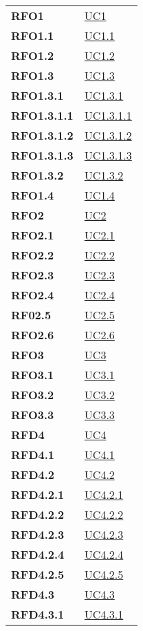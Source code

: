 \begin{longtable}[H]{>{\centering\bfseries}m{8cm} >{\centering\arraybackslash}m{8cm}}
    RFO1 & \hyperref[sub:uc1]{UC1} \\
    RFO1.1 & \hyperref[ssub:uc1.1]{UC1.1} \\
    RFO1.2 & \hyperref[ssub:uc1.2]{UC1.2} \\
    RFO1.3 & \hyperref[ssub:uc1.3]{UC1.3} \\
    RFO1.3.1 & \hyperref[par:uc1.3.1]{UC1.3.1} \\
    RFO1.3.1.1 & \hyperref[spar:uc1.3.1.1]{UC1.3.1.1} \\
    RFO1.3.1.2 & \hyperref[spar:uc1.3.1.2]{UC1.3.1.2} \\
    RFO1.3.1.3 & \hyperref[spar:uc1.3.1.3]{UC1.3.1.3} \\
    RFO1.3.2 & \hyperref[par:uc1.3.2]{UC1.3.2} \\
    RFO1.4 & \hyperref[ssub:uc1.4]{UC1.4} \\
    RFO2 & \hyperref[sub:uc2]{UC2} \\
    RFO2.1 & \hyperref[ssub:uc2.1]{UC2.1} \\
    RFO2.2 & \hyperref[ssub:uc2.2]{UC2.2} \\
    RFO2.3 & \hyperref[ssub:uc2.3]{UC2.3} \\
    RFO2.4 & \hyperref[ssub:uc2.4]{UC2.4} \\
    RF02.5 & \hyperref[ssub:uc2.5]{UC2.5} \\
    RFO2.6 & \hyperref[ssub:uc2.6]{UC2.6} \\
    RFO3 & \hyperref[sub:uc3]{UC3} \\
    RFO3.1 & \hyperref[ssub:uc3.1]{UC3.1} \\
    RFO3.2 & \hyperref[ssub:uc3.2]{UC3.2} \\
    RFO3.3 & \hyperref[ssub:uc3.3]{UC3.3} \\
    RFD4 & \hyperref[sub:uc4]{UC4} \\
    RFD4.1 & \hyperref[ssub:uc4.1]{UC4.1} \\
    RFD4.2 & \hyperref[ssub:uc4.2]{UC4.2} \\
    RFD4.2.1 & \hyperref[par:uc4.2.1]{UC4.2.1} \\
    RFD4.2.2 & \hyperref[par:uc4.2.2]{UC4.2.2} \\
    RFD4.2.3 & \hyperref[par:uc4.2.3]{UC4.2.3} \\
    RFD4.2.4 & \hyperref[par:uc4.2.4]{UC4.2.4} \\
    RFD4.2.5 & \hyperref[par:uc4.2.5]{UC4.2.5} \\
    RFD4.3 & \hyperref[ssub:uc4.3]{UC4.3} \\
    RFD4.3.1 & \hyperref[par:uc4.3.1]{UC4.3.1} \\

\end{longtable}
